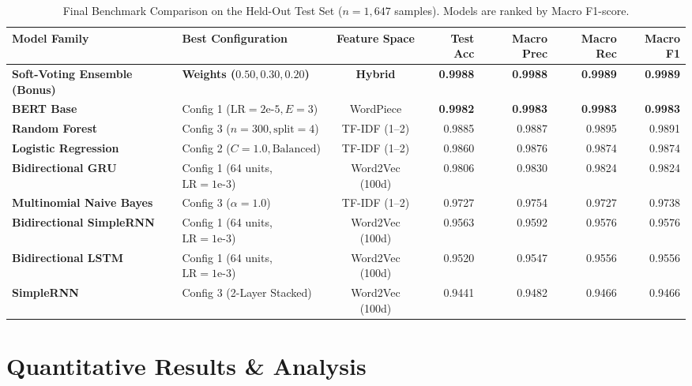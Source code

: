 \documentclass[11pt,a4paper]{article}
\begin{document}
\begin{table}[t]
\centering
\small
\begin{tabularx}{\textwidth}{lXcrrrr}
\toprule
\textbf{Model Family} & \textbf{Best Configuration} & \textbf{Feature Space} & \textbf{Test Acc} & \textbf{Macro Prec} & \textbf{Macro Rec} & \textbf{Macro F1} \\
\midrule
\textbf{Soft-Voting Ensemble (Bonus)} & \textbf{Weights ($0.50, 0.30, 0.20$)} & \textbf{Hybrid} & \textbf{0.9988} & \textbf{0.9988} & \textbf{0.9989} & \textbf{0.9989} \\
\textbf{BERT Base} & Config 1 ($\text{LR}=2\text{e-}5, E=3$) & WordPiece & \textbf{0.9982} & \textbf{0.9983} & \textbf{0.9983} & \textbf{0.9983} \\
\textbf{Random Forest} & Config 3 ($n=300, \text{split}=4$) & TF-IDF (1--2) & 0.9885 & 0.9887 & 0.9895 & 0.9891 \\
\textbf{Logistic Regression} & Config 2 ($C=1.0, \text{Balanced}$) & TF-IDF (1--2) & 0.9860 & 0.9876 & 0.9874 & 0.9874 \\
\textbf{Bidirectional GRU} & Config 1 (64 units, $\text{LR}=1\text{e-}3$) & Word2Vec (100d) & 0.9806 & 0.9830 & 0.9824 & 0.9824 \\
\textbf{Multinomial Naive Bayes} & Config 3 ($\alpha=1.0$) & TF-IDF (1--2) & 0.9727 & 0.9754 & 0.9727 & 0.9738 \\
\textbf{Bidirectional SimpleRNN} & Config 1 (64 units, $\text{LR}=1\text{e-}3$) & Word2Vec (100d) & 0.9563 & 0.9592 & 0.9576 & 0.9576 \\
\textbf{Bidirectional LSTM} & Config 1 (64 units, $\text{LR}=1\text{e-}3$) & Word2Vec (100d) & 0.9520 & 0.9547 & 0.9556 & 0.9556 \\
\textbf{SimpleRNN} & Config 3 (2-Layer Stacked) & Word2Vec (100d) & 0.9441 & 0.9482 & 0.9466 & 0.9466 \\
\bottomrule
\end{tabularx}
\caption{Final Benchmark Comparison on the Held-Out Test Set ($n = 1,647$ samples). Models are ranked by Macro F1-score.}
\label{tab:test_benchmark}
\end{table}

\section{Quantitative Results \& Analysis}
\label{sec:results}
\end{document}
